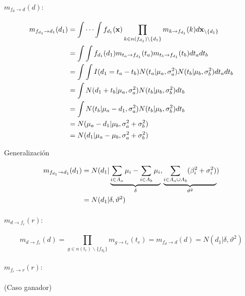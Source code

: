 \documentclass[11pt,twoside,spanish]{report} %
\begin{document}
\paragraph{$m_{f_{d}\rightarrow d}(d):$}

\begin{equation}
	\centering
	\begin{split}
		m_{f_{d_1}\rightarrow d_1}(d_1) & = \int\cdots\int f_{d_1}(\textbf{x})\prod_{k\in n(f_{d_1})\backslash\{d_1\}} m_{k\rightarrow f_{d_1}}(k)d\textbf{x}_{\backslash \{d_1\}} \\
		& = \int\int f_{d_1}(d_1)m_{t_a\rightarrow f_{d_1}}(t_a)m_{t_b\rightarrow f_{d_1}}(t_b)dt_adt_b\\
		& = \int\int I(d_1=t_a-t_b)N(t_a \vert \mu_a,\sigma_a^2)N(t_b \vert \mu_b,\sigma_b^2)dt_adt_b\\
		& =\int N(d_1+t_b \vert \mu_a,\sigma_a^2)N(t_b \vert \mu_b,\sigma_b^2)dt_b\\
		& =\int N(t_b \vert \mu_a-d_1,\sigma_a^2)N(t_b \vert \mu_b,\sigma_b^2)dt_b\\
		& =N( \mu_a-d_1 \vert  \mu_b,\sigma_a^2+\sigma_b^2)\\
		& =N(d_1 \vert  \mu_a-\mu_b,\sigma_a^2+\sigma_b^2)
	\end{split}
\end{equation}

Generalizaci\'on

\begin{equation}
	\centering
	\begin{split}
		m_{f_{d_1}\rightarrow d_1}(d_1)& = N(d_1 \vert  \underbrace{\sum_{i\in A_a}\mu_i-\sum_{i\in A_b}\mu_i}_{\delta},\underbrace{\sum_{i\in A_a \cup A_b}(\beta_i^2+\sigma_i^2)}_{\vartheta^2})\\
		& =  N(d_1 \vert  \delta,\vartheta^2)
	\end{split}
\end{equation}


\paragraph{$m_{d \rightarrow f_r}(r):$}

\begin{equation}
	m_{d \rightarrow f_r}(d) = \prod_{g\in n(t_e)\backslash\{f_{d_k}\}} m_{g \rightarrow t_e} (t_e)
	= m_{f_d \rightarrow d}(d)= N(d_1 \vert \delta, \vartheta^2)
\end{equation}

\paragraph{$m_{f_r \rightarrow r}(r):$} (Caso ganador)
\end{document}
